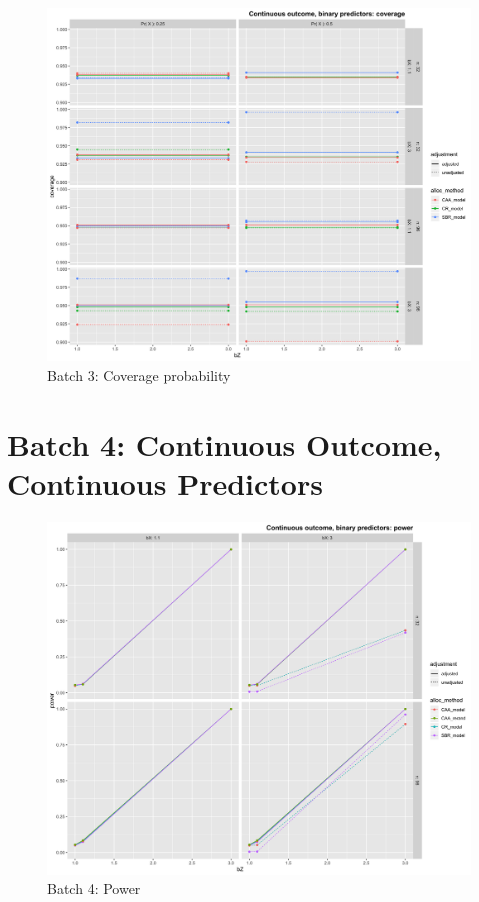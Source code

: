 \begin{figure}[H]
	\includegraphics[width=\linewidth]{figures/b3_coverage_all_methods_adj_unadj}
	\caption{Batch 3: Coverage probability}
	\label{fig:b3c}
\end{figure}

\section[Continuous Y, continuous X]{Batch 4: Continuous Outcome, Continuous Predictors}

\begin{figure}[H]
	\includegraphics[width=\linewidth]{figures/b4_power_all_methods_adj_unadj}
	\caption{Batch 4: Power}
	\label{fig:c7b4p}
\end{figure}

